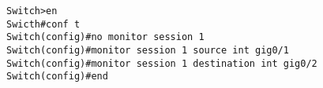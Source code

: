 \begin{lstlisting}
Switch>en
Swicth#conf t
Switch(config)#no monitor session 1
Switch(config)#monitor session 1 source int gig0/1
Switch(config)#monitor session 1 destination int gig0/2
Switch(config)#end
\end{lstlisting}
